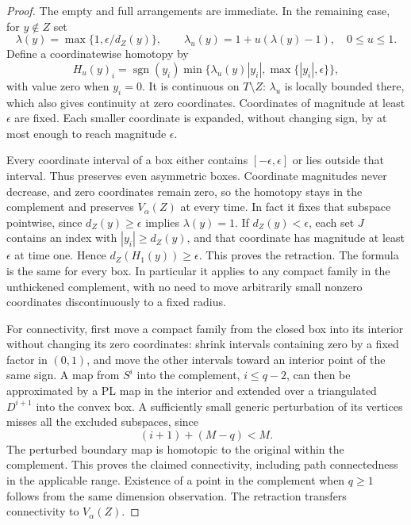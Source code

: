 \begin{proof}
The empty and full arrangements are immediate.  In the remaining case,
for $y\notin Z$ set
\[
 \lambda(y)=\max\{1,\epsilon/d_Z(y)\},
 \qquad \lambda_u(y)=1+u(\lambda(y)-1),\quad 0\le u\le1.
\]
Define a coordinatewise homotopy by
\begin{equation}\label{eq:coordinate-expansion}
 H_u(y)_i=\operatorname{sgn}(y_i)
 \min\{\lambda_u(y)|y_i|,\max\{|y_i|,\epsilon\}\},
\end{equation}
with value zero when $y_i=0$.  It is continuous on $T\setminus Z$:
$\lambda_u$ is locally bounded there, which also gives continuity at
zero coordinates.  Coordinates of magnitude at least $\epsilon$ are
fixed.  Each smaller coordinate is expanded, without changing sign,
by at most enough to reach magnitude $\epsilon$.

Every coordinate interval of a box either contains
$[-\epsilon,\epsilon]$ or lies outside that interval.  Thus
 preserves even asymmetric boxes.
Coordinate magnitudes never decrease, and zero coordinates remain zero,
so the homotopy stays in the complement and preserves
$V_\alpha(Z)$ at every time.  In fact it fixes that subspace pointwise,
since $d_Z(y)\ge\epsilon$ implies $\lambda(y)=1$.
If $d_Z(y)<\epsilon$, each set $J$ contains an index with
$|y_i|\ge d_Z(y)$, and that coordinate has magnitude at least
$\epsilon$ at time one.  Hence $d_Z(H_1(y))\ge\epsilon$.
This proves the retraction.  The formula is the same for every box.
In particular it applies to any compact family in the unthickened
complement, with no need to move arbitrarily small nonzero coordinates
discontinuously to a fixed radius.

For connectivity, first move a compact family from the closed box into
its interior without changing its zero coordinates: shrink intervals
containing zero by a fixed factor in $(0,1)$, and move the other intervals toward an
interior point of the same sign.  A map from $S^i$ into the complement,
$i\le q-2$, can then be approximated by a PL map in the interior and
extended over a triangulated $D^{i+1}$ into the convex box.  A sufficiently
small generic perturbation of its vertices misses all the excluded
subspaces, since
\[
 (i+1)+(M-q)<M.
\]
The perturbed boundary map is homotopic to the original within the
complement.  This proves the claimed connectivity, including path
connectedness in the applicable range.  Existence of a point in the
complement when $q\ge1$ follows from the same dimension observation.
The retraction transfers connectivity to $V_\alpha(Z)$.
\end{proof}

